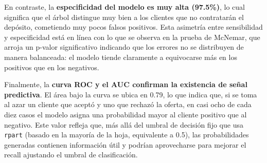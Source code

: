 \documentclass[
]{article}
\begin{document}
En contraste, la \textbf{especificidad del modelo es muy alta (97.5\%)},
lo cual significa que el árbol distingue muy bien a los clientes que no
contratarán el depósito, cometiendo muy pocos falsos positivos. Esta
asimetría entre sensibilidad y especificidad está en línea con lo que se
observa en la prueba de McNemar, que arroja un p-valor significativo
indicando que los errores no se distribuyen de manera balanceada: el
modelo tiende claramente a equivocarse más en los positivos que en los
negativos.

Finalmente, la \textbf{curva ROC y el AUC confirman la existencia de
señal predictiva}. El área bajo la curva se ubica en 0.79, lo que indica
que, si se toma al azar un cliente que aceptó y uno que rechazó la
oferta, en casi ocho de cada diez casos el modelo asigna una
probabilidad mayor al cliente positivo que al negativo. Este valor
refleja que, más allá del umbral de decisión fijo que usa \texttt{rpart}
(basado en la mayoría de la hoja, equivalente a 0.5), las probabilidades
generadas contienen información útil y podrían aprovecharse para mejorar
el recall ajustando el umbral de clasificación.
\end{document}
